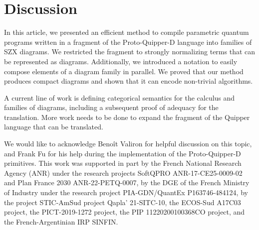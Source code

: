 \section{Discussion}

In this article, we presented an efficient method to compile
parametric quantum programs written in a fragment of the Proto-Quipper-D
language into families of SZX diagrams.
We restricted the fragment to strongly normalizing terms that can be represented
as diagrams.
Additionally, we introduced a notation to easily compose elements of a diagram
family in parallel.
We proved that our method produces compact diagrams
and shown that it can encode non-trivial algorithms.

A current line of work is defining categorical semantics for the calculus and
families of diagrams, including a subsequent proof of adequacy for the
translation. More work needs to be done to expand the fragment of the Quipper
language that can be translated.

We would like to acknowledge Benoît Valiron for helpful discussion on this
topic, and Frank Fu for his help during the implementation of the
Proto-Quipper-D primitives. This work was supported in part by the French
National Research Agency (ANR) under the research projects SoftQPRO
ANR-17-CE25-0009-02 and Plan France 2030 ANR-22-PETQ-0007, by the DGE of the
French Ministry of Industry under the research project PIA-GDN/QuantEx
P163746-484124, by the project STIC-AmSud project Qapla' 21-SITC-10, the
ECOS-Sud A17C03 project, the PICT-2019-1272 project, the  PIP 11220200100368CO
project, and the French-Argentinian IRP SINFIN.
